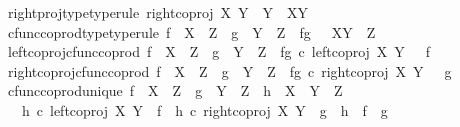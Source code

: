 \begin{isabellebody}
\ \ right{\isacharunderscore}{\kern0pt}proj{\isacharunderscore}{\kern0pt}type{\isacharbrackleft}{\kern0pt}type{\isacharunderscore}{\kern0pt}rule{\isacharbrackright}{\kern0pt}{\isacharcolon}{\kern0pt}\ {\isachardoublequoteopen}right{\isacharunderscore}{\kern0pt}coproj\ X\ Y\ {\isacharcolon}{\kern0pt}\ Y\ {\isasymrightarrow}\ X{\isasymCoprod}Y{\isachardoublequoteclose}\ \isanewline
\ \ cfunc{\isacharunderscore}{\kern0pt}coprod{\isacharunderscore}{\kern0pt}type{\isacharbrackleft}{\kern0pt}type{\isacharunderscore}{\kern0pt}rule{\isacharbrackright}{\kern0pt}{\isacharcolon}{\kern0pt}\ {\isachardoublequoteopen}f\ {\isacharcolon}{\kern0pt}\ X\ {\isasymrightarrow}\ Z\ {\isasymLongrightarrow}\ g\ {\isacharcolon}{\kern0pt}\ Y\ {\isasymrightarrow}\ Z\ {\isasymLongrightarrow}\ f{\isasymamalg}g\ {\isacharcolon}{\kern0pt}\ \ X{\isasymCoprod}Y\ {\isasymrightarrow}\ Z{\isachardoublequoteclose}\ \isanewline
\ \ left{\isacharunderscore}{\kern0pt}coproj{\isacharunderscore}{\kern0pt}cfunc{\isacharunderscore}{\kern0pt}coprod{\isacharcolon}{\kern0pt}\ {\isachardoublequoteopen}f\ {\isacharcolon}{\kern0pt}\ X\ {\isasymrightarrow}\ Z\ {\isasymLongrightarrow}\ g\ {\isacharcolon}{\kern0pt}\ Y\ {\isasymrightarrow}\ Z\ {\isasymLongrightarrow}\ f{\isasymamalg}g\ {\isasymcirc}\isactrlsub c\ {\isacharparenleft}{\kern0pt}left{\isacharunderscore}{\kern0pt}coproj\ X\ Y{\isacharparenright}{\kern0pt}\ \ {\isacharequal}{\kern0pt}\ f{\isachardoublequoteclose}\ \isanewline
\ \ right{\isacharunderscore}{\kern0pt}coproj{\isacharunderscore}{\kern0pt}cfunc{\isacharunderscore}{\kern0pt}coprod{\isacharcolon}{\kern0pt}\ {\isachardoublequoteopen}f\ {\isacharcolon}{\kern0pt}\ X\ {\isasymrightarrow}\ Z\ {\isasymLongrightarrow}\ g\ {\isacharcolon}{\kern0pt}\ Y\ {\isasymrightarrow}\ Z\ {\isasymLongrightarrow}\ f{\isasymamalg}g\ {\isasymcirc}\isactrlsub c\ {\isacharparenleft}{\kern0pt}right{\isacharunderscore}{\kern0pt}coproj\ X\ Y{\isacharparenright}{\kern0pt}\ \ {\isacharequal}{\kern0pt}\ g{\isachardoublequoteclose}\ \isanewline
\ \ cfunc{\isacharunderscore}{\kern0pt}coprod{\isacharunderscore}{\kern0pt}unique{\isacharcolon}{\kern0pt}\ {\isachardoublequoteopen}f\ {\isacharcolon}{\kern0pt}\ X\ {\isasymrightarrow}\ Z\ {\isasymLongrightarrow}\ g\ {\isacharcolon}{\kern0pt}\ Y\ {\isasymrightarrow}\ Z\ {\isasymLongrightarrow}\ h\ {\isacharcolon}{\kern0pt}\ X\ {\isasymCoprod}\ Y\ {\isasymrightarrow}\ Z\ {\isasymLongrightarrow}\ \isanewline
\ \ \ \ h\ {\isasymcirc}\isactrlsub c\ left{\isacharunderscore}{\kern0pt}coproj\ X\ Y\ {\isacharequal}{\kern0pt}\ f\ {\isasymLongrightarrow}\ h\ {\isasymcirc}\isactrlsub c\ right{\isacharunderscore}{\kern0pt}coproj\ X\ Y\ {\isacharequal}{\kern0pt}\ g\ {\isasymLongrightarrow}\ h\ {\isacharequal}{\kern0pt}\ f\ {\isasymamalg}\ g{\isachardoublequoteclose}\isanewline

\end{isabellebody}
